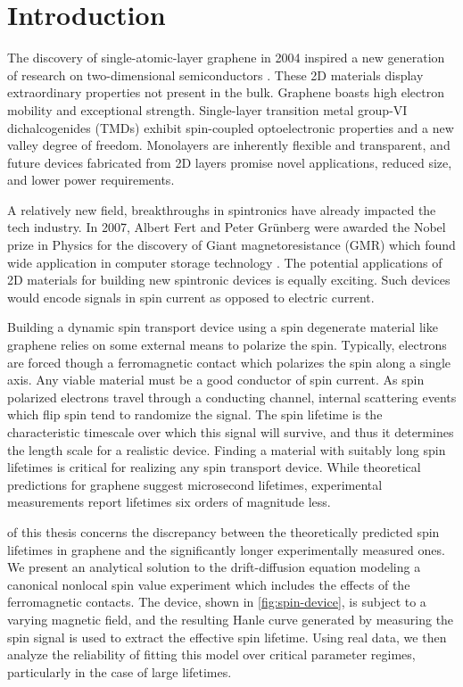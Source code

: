 \chapter{Introduction}

The discovery of single-atomic-layer graphene in 2004
inspired a new generation of research on two-dimensional semiconductors
\cite{Novoselov666}.
These 2D materials display extraordinary properties not present in the bulk.
Graphene boasts high electron mobility and exceptional strength.
Single-layer transition metal group-VI dichalcogenides (TMDs)
exhibit spin-coupled optoelectronic properties
and a new valley degree of freedom.
Monolayers are inherently flexible and transparent,
and future devices fabricated from 2D layers promise
novel applications, reduced size, and lower power requirements.

A relatively new field, breakthroughs in spintronics
have already impacted the tech industry.
In 2007, Albert Fert and Peter Grünberg were awarded
the Nobel prize in Physics for the discovery of
Giant magnetoresistance (GMR)
which found wide application in computer storage technology
\cite{PhysRevB.39.4828}.
The potential applications of 2D materials for
building new spintronic devices is equally exciting.
Such devices would encode signals in spin current
as opposed to electric current.

Building a dynamic spin transport device using a
spin degenerate material like graphene
relies on some external means to polarize the spin.
Typically, electrons are forced though a ferromagnetic contact
which polarizes the spin along a single axis.
Any viable material must be a good conductor of spin current.
As spin polarized electrons travel through a conducting channel,
internal scattering events which flip spin tend to randomize the signal.
The spin lifetime is the characteristic timescale
over which this signal will survive,
and thus it determines the length scale for a realistic device.
Finding a material with suitably long spin lifetimes
is critical for realizing any spin transport device.
While theoretical predictions for graphene suggest microsecond lifetimes,
experimental measurements report lifetimes six orders of magnitude less.

 of this thesis
concerns the discrepancy
between the theoretically predicted spin lifetimes in graphene
and the significantly longer experimentally measured ones.
We present an analytical solution to the drift-diffusion equation
modeling a canonical nonlocal spin value experiment which
includes the effects of the ferromagnetic contacts.
The device, shown in \cref{fig:spin-device},
is subject to a varying magnetic field,
and the resulting Hanle curve generated by measuring the spin signal
is used to extract the effective spin lifetime.
Using real data, we then analyze the reliability of fitting this model
over critical parameter regimes, particularly in the case of large lifetimes.

